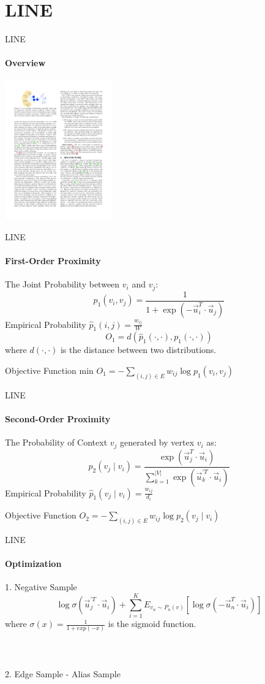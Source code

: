 \documentclass{beamer}
\begin{document}
\section{LINE}
\begin{frame}{LINE}
    \framesubtitle{Overview}
    \centering\includegraphics[height=6cm]{line.pdf}
\end{frame}
\begin{frame}{LINE}
    \framesubtitle{First-Order Proximity}
    The Joint Probability between $v_i$ and $v_j$:
    $$p_{1}\left(v_{i}, v_{j}\right)=\frac{1}{1+\exp \left(-\vec{u}_{i}^{T} \cdot \vec{u}_{j}\right)}$$ 
    Empirical Probability $\hat{p}_1(i, j)=\frac{w_{ij}}{W}$
    $$O_{1}=d\left(\hat{p}_{1}(\cdot, \cdot), p_{1}(\cdot, \cdot)\right)$$ 
    where $d(·, ·)$ is the distance between two distributions.
    \begin{block}{Objective Function}
        min $O_{1}=-\sum_{(i, j) \in E} w_{i j} \log p_{1}\left(v_{i}, v_{j}\right)$
    \end{block}
\end{frame}
\begin{frame}{LINE}
    \framesubtitle{Second-Order Proximity}
    The Probability of Context $v_j$ generated by vertex $v_i$ as:
    $$
    p_{2}\left(v_{j} \mid v_{i}\right)=\frac{\exp \left(\vec{u}_{j}^{T} \cdot \vec{u}_{i}\right)}{\sum_{k=1}^{|V|} \exp \left(\vec{u}_{k}^{\prime T} \cdot \vec{u}_{i}\right)}
    $$
    Empirical Probability $\hat{p}_1(v_j \mid v_i)=\frac{w_{ij}}{d_i}$
    \begin{block}{Objective Function}
        $O_{2}=-\sum_{(i, j) \in E} w_{i j} \log p_{2}\left(v_{j} \mid v_{i}\right)$
    \end{block}
\end{frame}
\begin{frame}{LINE}
    \framesubtitle{Optimization}
    1. Negative Sample
    $$
    \log \sigma\left(\vec{u}_{j}^{\prime T} \cdot \vec{u}_{i}\right)+\sum_{i=1}^{K} E_{v_{n} \sim P_{n}(v)}\left[\log \sigma\left(-\vec{u}_{n}^{T} \cdot \vec{u}_{i}\right)\right]
    $$
    where $\sigma (x) = \frac{1}{1 + exp(−x)}$ is the sigmoid function.\\
    \hspace*{\fill}\\ 
    \hspace*{\fill}\\ 
    \hspace*{\fill}\\
    2. Edge Sample - Alias Sample
\end{frame}
\end{document}
